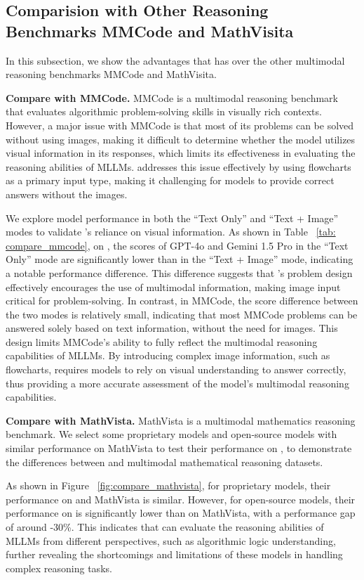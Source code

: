 \subsection{Comparision with Other Reasoning Benchmarks MMCode and MathVisita}


In this subsection, we show the advantages that \benchmark has over the other multimodal reasoning benchmarks MMCode and MathVisita.

\textbf{Compare with MMCode. }MMCode is a multimodal reasoning benchmark that evaluates algorithmic problem-solving skills in visually rich contexts. However, a major issue with MMCode is that most of its problems can be solved without using images, making it difficult to determine whether the model utilizes visual information in its responses, which limits its effectiveness in evaluating the reasoning abilities of MLLMs. \benchmark addresses this issue effectively by using flowcharts as a primary input type, making it challenging for models to provide correct answers without the images.

We explore model performance in both the ``Text Only'' and ``Text + Image'' modes to validate \benchmark’s reliance on visual information. As shown in Table ~\ref{tab: compare_mmcode}, on \benchmark, the scores of GPT-4o and Gemini 1.5 Pro in the ``Text Only'' mode are significantly lower than in the ``Text + Image'' mode, indicating a notable performance difference. This difference suggests that \benchmark’s problem design effectively encourages the use of multimodal information, making image input critical for problem-solving. In contrast, in MMCode, the score difference between the two modes is relatively small, indicating that most MMCode problems can be answered solely based on text information, without the need for images. This design limits MMCode’s ability to fully reflect the multimodal reasoning capabilities of MLLMs. By introducing complex image information, such as flowcharts, \benchmark requires models to rely on visual understanding to answer correctly, thus providing a more accurate assessment of the model's multimodal reasoning capabilities.


\textbf{Compare with MathVista. }MathVista is a multimodal mathematics reasoning benchmark. We select some proprietary models and open-source models with similar performance on MathVista to test their performance on \benchmark, to demonstrate the differences between \benchmark and multimodal mathematical reasoning datasets.

As shown in Figure ~\ref{fig:compare_mathvista}, for proprietary models, their performance on \benchmark and MathVista is similar. However, for open-source models, their performance on \benchmark is significantly lower than on MathVista, with a performance gap of around -30\%. This indicates that \benchmark can evaluate the reasoning abilities of MLLMs from different perspectives, such as algorithmic logic understanding, further revealing the shortcomings and limitations of these models in handling complex reasoning tasks.



